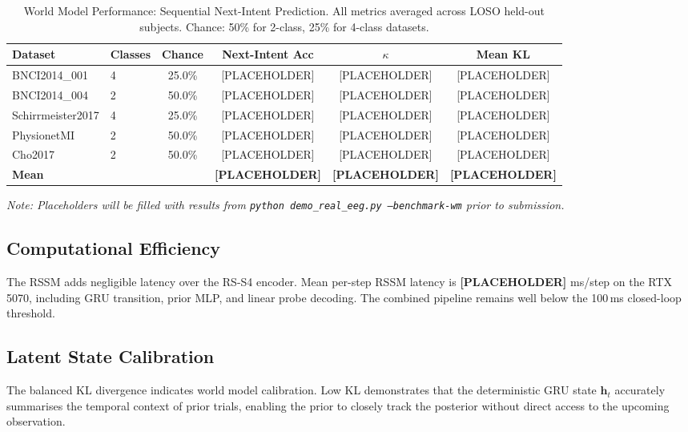 \documentclass[11pt,a4paper]{article}
\begin{document}
\begin{table}[ht]
\centering
\caption{World Model Performance: Sequential Next-Intent Prediction. All metrics averaged across LOSO held-out subjects. Chance: 50\% for 2-class, 25\% for 4-class datasets.}
\label{tab:wm_results}
\begin{tabular}{@{}llcccc@{}}
\toprule
\textbf{Dataset} & \textbf{Classes} & \textbf{Chance} & \textbf{Next-Intent Acc} & \textbf{$\kappa$} & \textbf{Mean KL} \\ \midrule
BNCI2014\_001     & 4 & 25.0\% & [PLACEHOLDER] & [PLACEHOLDER] & [PLACEHOLDER] \\
BNCI2014\_004     & 2 & 50.0\% & [PLACEHOLDER] & [PLACEHOLDER] & [PLACEHOLDER] \\
Schirrmeister2017 & 4 & 25.0\% & [PLACEHOLDER] & [PLACEHOLDER] & [PLACEHOLDER] \\
PhysionetMI       & 2 & 50.0\% & [PLACEHOLDER] & [PLACEHOLDER] & [PLACEHOLDER] \\
Cho2017           & 2 & 50.0\% & [PLACEHOLDER] & [PLACEHOLDER] & [PLACEHOLDER] \\ \midrule
\textbf{Mean}     &   &        & \textbf{[PLACEHOLDER]} & \textbf{[PLACEHOLDER]} & \textbf{[PLACEHOLDER]} \\ \bottomrule
\end{tabular}
\end{table}

\noindent \textit{Note: Placeholders will be filled with results from \texttt{python demo\_real\_eeg.py --benchmark-wm} prior to submission.}

\subsection{Computational Efficiency}
The RSSM adds negligible latency over the RS-S4 encoder. Mean per-step RSSM latency is \textbf{[PLACEHOLDER]} ms/step on the RTX 5070, including GRU transition, prior MLP, and linear probe decoding. The combined pipeline remains well below the 100\,ms closed-loop threshold.

\subsection{Latent State Calibration}
The balanced KL divergence indicates world model calibration. Low KL demonstrates that the deterministic GRU state $\mathbf{h}_t$ accurately summarises the temporal context of prior trials, enabling the prior to closely track the posterior without direct access to the upcoming observation.
\end{document}
